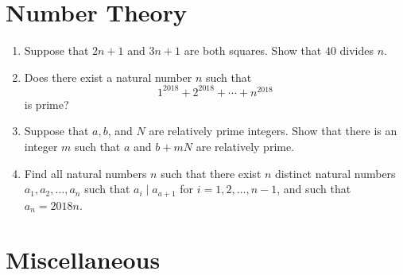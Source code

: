 \documentclass{article}
\begin{document}
\section*{Number Theory}

\begin{enumerate}[1.]

\item %
Suppose that $2n + 1$ and $3n + 1$ are both squares. Show that $40$ divides $n$.


\item %
Does there exist a natural number $n$ such that
\[
	1^{2018} + 2^{2018} + \cdots + n^{2018}
\]
is prime?


\item %
Suppose that $a, b$, and $N$ are relatively prime integers. Show that there is an integer $m$ such that $a$ and $b + mN$ are relatively prime.


\item %
Find all natural numbers $n$ such that there exist $n$ distinct natural numbers $a_1, a_2, \dots, a_n$ such that $a_{i} \mid a_{a + 1}$ for $i = 1, 2, \dots, n-1$, and such that $a_n = 2018 n$.


\end{enumerate}

\section*{Miscellaneous}
\end{document}
